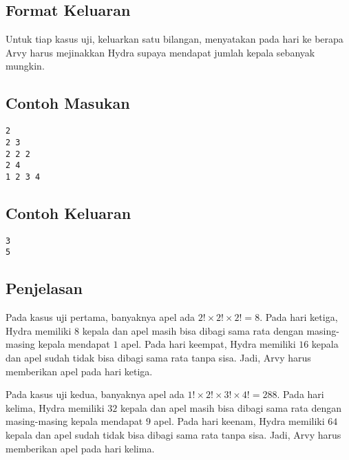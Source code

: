 \documentclass{article}
\begin{document}
\subsection*{Format Keluaran}
Untuk tiap kasus uji, keluarkan satu bilangan, menyatakan pada hari ke berapa Arvy harus mejinakkan Hydra supaya mendapat jumlah kepala sebanyak mungkin.

\begin{multicols}{2}
\subsection*{Contoh Masukan}
\begin{lstlisting}
2
2 3
2 2 2
2 4
1 2 3 4
\end{lstlisting}
\columnbreak
\subsection*{Contoh Keluaran}
\begin{lstlisting}
3
5
\end{lstlisting}
\vfill
\null
\end{multicols}

\subsection*{Penjelasan}
Pada kasus uji pertama, banyaknya apel ada $2! \times 2! \times 2! = 8$.
Pada hari ketiga, Hydra memiliki $8$ kepala dan apel masih bisa dibagi sama rata dengan masing-masing kepala mendapat $1$ apel.
Pada hari keempat, Hydra memiliki $16$ kepala dan apel sudah tidak bisa dibagi sama rata tanpa sisa.
Jadi, Arvy harus memberikan apel pada hari ketiga.

Pada kasus uji kedua, banyaknya apel ada $1! \times 2! \times 3! \times 4! = 288$.
Pada hari kelima, Hydra memiliki $32$ kepala dan apel masih bisa dibagi sama rata dengan masing-masing kepala mendapat $9$ apel.
Pada hari keenam, Hydra memiliki $64$ kepala dan apel sudah tidak bisa dibagi sama rata tanpa sisa.
Jadi, Arvy harus memberikan apel pada hari kelima.

\pagebreak
\end{document}
